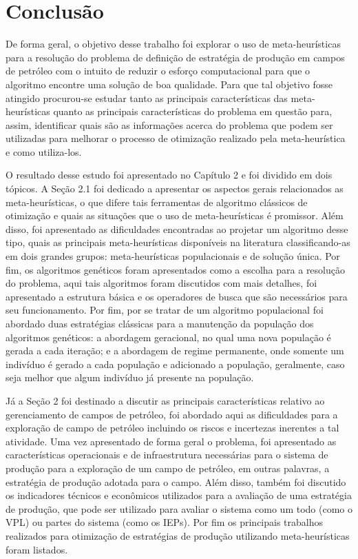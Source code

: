 
\chapter{Conclusão}
\label{ch:6_Conclusao}
De forma geral, o objetivo desse trabalho foi explorar o uso de meta-heurísticas para a resolução do problema de definição de estratégia de produção em campos de petróleo com o intuito de reduzir o esforço computacional para que o algoritmo encontre uma solução de boa qualidade. Para que tal objetivo fosse atingido procurou-se estudar tanto as principais características das meta-heurísticas quanto as principais características do problema em questão para, assim, identificar quais são as informações acerca do problema que podem ser utilizadas para melhorar o processo de otimização realizado pela meta-heurística e como utiliza-los.  

O resultado desse estudo foi apresentado no Capítulo 2 e foi dividido em dois tópicos. A Seção  2.1 foi dedicado a apresentar os aspectos gerais relacionados as meta-heurísticas, o que difere tais ferramentas de algoritmo clássicos de otimização e quais as situações que o uso de meta-heurísticas é promissor. Além disso, foi apresentado as dificuldades encontradas ao projetar um algoritmo desse tipo, quais as principais meta-heurísticas disponíveis na literatura classificando-as em dois grandes grupos: meta-heurísticas populacionais e de solução única. Por fim, os algoritmos genéticos foram apresentados como a escolha para a resolução do problema, aqui tais algoritmos foram discutidos com mais detalhes, foi apresentado a estrutura básica e os operadores de busca que são necessários para seu funcionamento. Por fim, por se tratar de um algoritmo populacional foi abordado duas estratégias clássicas para a manutenção da população dos algoritmos genéticos: a abordagem geracional, no qual uma nova população é gerada a cada iteração; e a abordagem de regime permanente, onde somente um indivíduo é gerado a cada população e adicionado a população, geralmente, caso seja melhor que algum indivíduo já presente na população. 

Já a Seção  2 foi destinado a discutir as principais características relativo ao gerenciamento de campos de petróleo, foi abordado aqui as dificuldades para a exploração de campo de petróleo incluindo os riscos e incertezas inerentes a tal atividade. Uma vez apresentado de forma geral o problema, foi apresentado as características operacionais e de infraestrutura necessárias para o sistema de produção para a exploração de um campo de petróleo, em outras palavras, a estratégia de produção adotada para o campo. Além disso, também foi discutido os indicadores técnicos e econômicos utilizados para a avaliação de uma estratégia de produção, que pode ser utilizado para avaliar o sistema como um todo (como o VPL) ou partes do sistema (como os IEPs). Por fim os principais trabalhos realizados para otimização de estratégias de produção utilizando meta-heurísticas foram listados.

